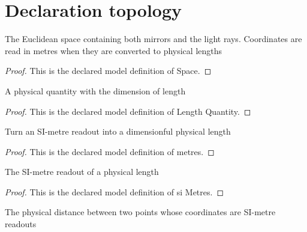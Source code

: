 \section{Declaration topology}
\begin{definition}[Space]
  \label{def:physics:phyx-mini-0002:phyxminiproblems-problem0002-space}
  The Euclidean space containing both mirrors and the light rays. Coordinates are read in metres when they are converted to physical lengths
\end{definition}
\begin{proof}
  This is the declared model definition of Space.
\end{proof}
\begin{definition}
  \label{def:physics:phyx-mini-0002:phyxminiproblems-problem0002-lengthquantity}
  A physical quantity with the dimension of length
\end{definition}
\begin{proof}
  This is the declared model definition of Length Quantity.
\end{proof}
\begin{definition}[metres]
  \label{def:physics:phyx-mini-0002:phyxminiproblems-problem0002-metres}
  Turn an SI-metre readout into a dimensionful physical length
\end{definition}
\begin{proof}
  This is the declared model definition of metres.
\end{proof}
\begin{definition}[si Metres]
  \label{def:physics:phyx-mini-0002:phyxminiproblems-problem0002-simetres}
  The SI-metre readout of a physical length
\end{definition}
\begin{proof}
  This is the declared model definition of si Metres.
\end{proof}
\begin{definition}
  \label{def:physics:phyx-mini-0002:phyxminiproblems-problem0002-physicaldistance}
  The physical distance between two points whose coordinates are SI-metre readouts
\end{definition}
